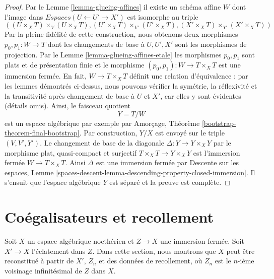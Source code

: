 \begin{proof}
\medskip\noindent
Par le Lemme \ref{lemma-glueing-affines} il existe un schéma affine $W$ dont
l'image dans $\textit{Espaces}(U \leftarrow U' \to X')$ est isomorphe au
triple
$$
((U \times_X T) \times_V (U \times_X T),
(U' \times_X T) \times_{V'} (U' \times_X T),
(X' \times_X T) \times_{Y'} (X' \times_X T))
$$
Par la pleine fidélité de cette construction, nous obtenons
deux morphismes $p_0, p_1 : W \to T$ dont les changements de base
à $U, U', X'$ sont les morphismes de projection.
Par le Lemme \ref{lemma-glueing-affines-etale}
les morphismes $p_0, p_1$ sont plats et de présentation finie et
le morphisme $(p_0, p_1) : W \to T \times_X T$ est une immersion fermée.
En fait, $W \to T \times_X T$ définit une relation d'équivalence : par les lemmes
démontrés ci-dessus, nous pouvons vérifier la symétrie, la réflexivité et la transitivité
après changement de base à $U$ et $X'$, car elles y sont évidentes (détails omis).
Ainsi, le faisceau quotient
$$
Y = T/W
$$
est un espace algébrique par exemple par
Amorçage, Théorème \ref{bootstrap-theorem-final-bootstrap}. Par construction, $Y/X$ est envoyé sur le triple $(V, V', Y')$. Le changement de base de la diagonale $\Delta : Y \to Y \times_X Y$ par le morphisme plat, quasi-compact et surjectif $T \times_X T \to Y \times_X Y$ est l'immersion fermée $W \to T \times_X T$. Ainsi $\Delta$ est une immersion fermée par Descente sur les espaces, Lemme \ref{spaces-descent-lemma-descending-property-closed-immersion}. Il s'ensuit que l'espace algébrique $Y$ est séparé et la preuve est complète. 
\end{proof}








\section{Coégalisateurs et recollement}
\label{section-coequalizer-glue}

\noindent
Soit $X$ un espace algébrique noethérien et $Z \to X$ une immersion fermée.
Soit $X' \to X$ l'éclatement dans $Z$. Dans cette section, nous montrons que
$X$ peut être reconstitué à partir de $X'$, $Z_n$ et des données de recollement, où $Z_n$
est le $n$-ième voisinage infinitésimal de $Z$ dans $X$.

